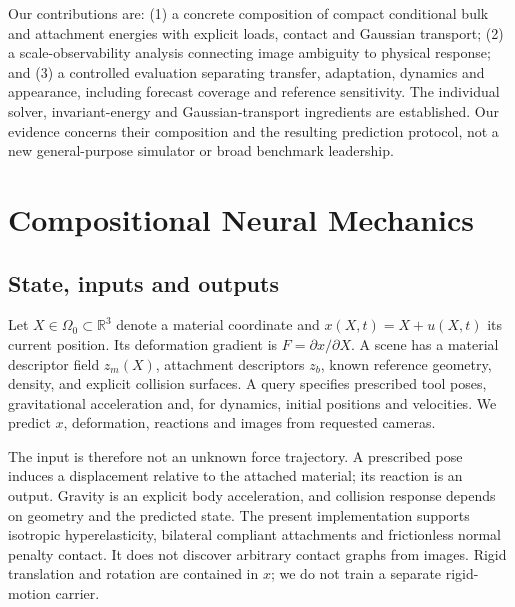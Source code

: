 \documentclass[10pt,twocolumn,letterpaper]{article}
\newcommand{\R}{\mathbb{R}}
\begin{document}
Our contributions are: (1) a concrete composition of compact conditional bulk and attachment energies with explicit loads, contact and Gaussian transport; (2) a scale-observability analysis connecting image ambiguity to physical response; and (3) a controlled evaluation separating transfer, adaptation, dynamics and appearance, including forecast coverage and reference sensitivity. The individual solver, invariant-energy and Gaussian-transport ingredients are established. Our evidence concerns their composition and the resulting prediction protocol, not a new general-purpose simulator or broad benchmark leadership.





\section{Compositional Neural Mechanics}
\subsection{State, inputs and outputs}
Let $X\in\Omega_0\subset\R^3$ denote a material coordinate and $x(X,t)=X+u(X,t)$ its current position. Its deformation gradient is $F=\partial x/\partial X$. A scene has a material descriptor field $z_m(X)$, attachment descriptors $z_b$, known reference geometry, density, and explicit collision surfaces. A query specifies prescribed tool poses, gravitational acceleration and, for dynamics, initial positions and velocities. We predict $x$, deformation, reactions and images from requested cameras.

The input is therefore not an unknown force trajectory. A prescribed pose induces a displacement relative to the attached material; its reaction is an output. Gravity is an explicit body acceleration, and collision response depends on geometry and the predicted state. The present implementation supports isotropic hyperelasticity, bilateral compliant attachments and frictionless normal penalty contact. It does not discover arbitrary contact graphs from images. Rigid translation and rotation are contained in $x$; we do not train a separate rigid-motion carrier.
\end{document}
